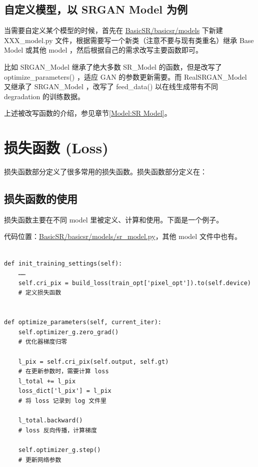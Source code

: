 \documentclass[../main.tex]{subfiles}
\begin{document}
\subsection{自定义模型，以 SRGAN Model 为例}

当需要自定义某个模型的时候，首先在 \href{https://github.com/XPixelGroup/BasicSR/blob/master/basicsr/models}{BasicSR/basicsr/models} 下新建 XXX\_model.py 文件，根据需要写一个新类（注意不要与现有类重名）继承 Base Model 或其他 model ，然后根据自己的需求改写主要函数即可。

比如 SRGAN\_Model 继承了绝大多数 SR\_Model 的函数，但是改写了 optimize\_parameters() ，适应 GAN 的参数更新需要。而 RealSRGAN\_Model 又继承了 SRGAN\_Model ，改写了 feed\_data() 以在线生成带有不同 degradation 的训练数据。

\begin{note} %
	上述被改写函数的介绍，参见章节\ref{Model:SR Model}。
\end{note}

\section{损失函数 (Loss)}

损失函数部分定义了很多常用的损失函数。损失函数部分定义在：
\subsection{损失函数的使用}

损失函数主要在不同 model 里被定义、计算和使用。下面是一个例子。

代码位置：\href{https://github.com/XPixelGroup/BasicSR/blob/master/basicsr/models/sr_model.py}{BasicSR/basicsr/models/sr\_model.py}，其他 model 文件中也有。

\begin{verbatim}

def init_training_settings(self):
    ……
    self.cri_pix = build_loss(train_opt['pixel_opt']).to(self.device)
    # 定义损失函数


def optimize_parameters(self, current_iter):
    self.optimizer_g.zero_grad()
    # 优化器梯度归零

    l_pix = self.cri_pix(self.output, self.gt)
    # 在更新参数时，需要计算 loss
    l_total += l_pix
    loss_dict['l_pix'] = l_pix
    # 将 loss 记录到 log 文件里
    
    l_total.backward()
    # loss 反向传播，计算梯度
    
    self.optimizer_g.step()
    # 更新网络参数
\end{verbatim}
\end{document}
